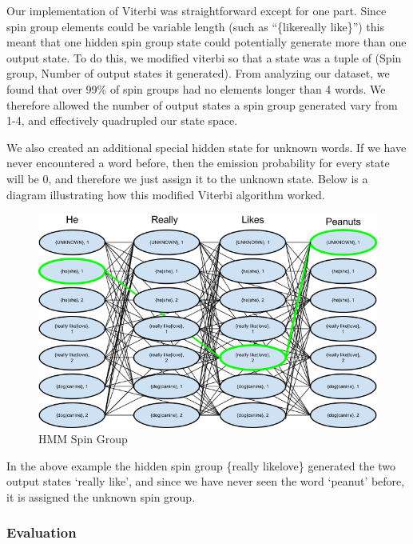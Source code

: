 \documentclass[11pt,letterpaper,oneside, titlepage]{scrartcl}
\begin{document}
Our implementation of Viterbi was straightforward except for one part. Since spin group elements could be variable length (such as ``\{like\textbar really like\}”) this meant that one hidden spin group state could potentially generate more than one output state. To do this, we modified viterbi so that a state was a tuple of (Spin group, Number of output states it generated). From analyzing our dataset, we found that over 99\% of spin groups had no elements longer than 4 words. We therefore allowed the number of output states a spin group generated vary from 1-4, and effectively quadrupled our state space. 

We also created an additional special hidden state for unknown words. If we have never encountered a word before, then the emission probability for every state will be 0, and therefore we just assign it to the unknown state. Below is a diagram illustrating how this modified Viterbi algorithm worked.

\begin{figure}[h!]
  \centering
  \includegraphics[width=1\textwidth]{hmm_spin_group}
  \caption{HMM Spin Group}
  \label{fig:hmm_spin_group}
\end{figure}

\clearpage

In the above example the hidden spin group \{really like\textbar love\} generated the two output states ‘really like’, and since we have never seen the word ‘peanut’ before, it is assigned the unknown spin group.

\subsubsection{Evaluation}
\end{document}
